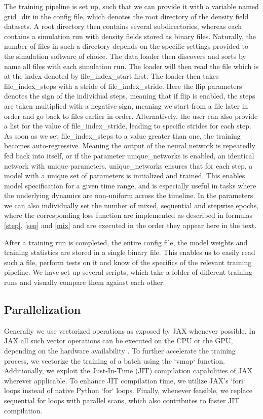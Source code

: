 \documentclass{article}
\begin{document}
The training pipeline is set up, such that we can provide it with a variable named grid\_dir in the config file, which denotes the root directory of the density field datasets. A root directory then contains several subdirectories, whereas each contains a simulation run with density fields stored as binary files. Naturally, the number of files in such a directory depends on the specific settings provided to the simulation software of choice. 
The data loader then discovers and sorts by name all files with each simulation run. The loader will then read the file which is at the index denoted by  file\_index\_start first. The loader then takes file\_index\_steps with a stride of file\_index\_stride. Here the flip parameters denotes the sign of the individual steps, meaning that if flip is enabled, the steps are taken multiplied with a negative sign, meaning we start from a file later in order and go back to files earlier in order. Alternatively, the user can also provide a list for the value of file\_index\_stride, leading to specific strides for each step. As soon as we set file\_index\_steps to a value greater than one, the training becomes auto-regressive. Meaning the output of the neural network is repeatedly fed back into itself, or if the parameter unique\_networks is enabled, an identical network with unique parameters. unique\_networks ensures that for each step, a model with a unique set of parameters is initialized and trained. This enables model specification for a given time range, and is especially useful in tasks where the underlying dynamics are non-uniform across the timeline. In the parameters we can also individually set the number of mixed, sequential and stepwise epochs, where the corresponding loss function are implemented as described in formulas \ref{step}, \ref{seq} and \ref{mix} and are executed in the order they appear here in the text.

After a training run is completed, the entire config file, the model weights and training statistics are stored in a single binary file. This enables us to easily read such a file, perform tests on it and know of the specifics of the relevant training pipeline. We have set up several scripts, which take a folder of different training runs and visually compare them against each other.

\subsection{Parallelization}

Generally we use vectorized operations as exposed by {JAX} whenever possible. In {JAX} all such vector operations can be executed on the CPU or the GPU, depending on the hardware availability \citep{jax2018github}. To further accelerate the training process, we vectorize the training of a batch using the `vmap` function. Additionally, we exploit the Just-In-Time (JIT) compilation capabilities of {JAX} wherever applicable. To enhance JIT compilation time, we utilize JAX's `fori` loops instead of native Python `for` loops. Finally, whenever feasible, we replace sequential for loops with parallel scans, which also contributes to faster JIT compilation.
\end{document}
